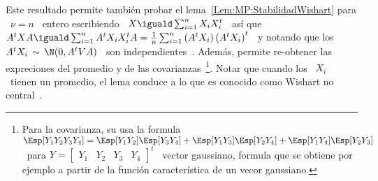 Este resultado  permite tambi\'en probar  el lema~\ref{Lem:MP:StabilidadWishart}
para \  $\nu = n$  \ entero  escribiendo \ $X  \iguald \sum_{i=1}^n X_i  X_i^t$ \
as\'i que \ $A^t X A \iguald  \sum_{i=1}^n A^t X_i X_i^t A = \frac1n \sum_{i=1}^n
\left( A^t X_i \right) \left( A^t X_i  \right)^t$ \ y notando que los \ $A^t X_i
\, \sim \, \N(0, A^t V A)$ \ son independientes~\cite{Seb04}.  Adem\'as, permite
re-obtener las  expreciones del promedio y de  las covarianzas~\footnote{Para la
  covarianza, su usa la formula \ $\Esp[Y_1 Y_2 Y_3 Y_4] = \Esp[Y_1 Y_2]\Esp[Y_3
  Y_4]  + \Esp[Y_1 Y_3]\Esp[Y_2  Y_4] +  \Esp[Y_1 Y_4]\Esp[Y_2  Y_3]$ \  para $Y
  = \begin{bmatrix} Y_1  & Y_2 & Y_3 & Y_4  \end{bmatrix}^t$ \ vector gaussiano,
  formula que se  obtiene por ejemplo a partir  de la funci\'on caracter\'istica
  de un vecor gaussiano.}. Notar que cuando los \ $X_i$ \ tienen un promedio, el
lema conduce a lo que es conocido como Wishart no central~\cite{And03, Seb04}.

